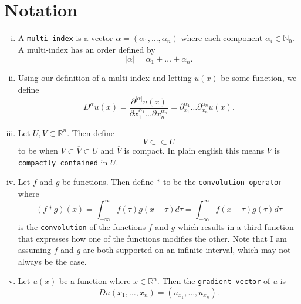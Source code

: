 \documentclass[11pt]{article}
\theoremstyle{definition}
\begin{document}
\section*{Notation}
%
\begin{enumerate}[(i)]
	\item A \texttt{multi-index} is a vector $\alpha = (\alpha_1, \dots, \alpha_n)$ where each component $\alpha_i \in \mathbb{N}_0$.
A multi-index has an order defined by
\[|\alpha| = \alpha_1 + \dots + \alpha_n.\]

\item Using our definition of a multi-index and letting $u(x)$ be some function, we define
\[D^{\alpha}u(x) = \frac{\partial^{|\alpha|}u(x)}{\partial x_1^{\alpha_1} \dots \partial x_n^{\alpha_n}} = \partial_{x_1}^{\alpha_1}\dots\partial_{x_n}^{\alpha_n}u(x).\]

\item Let $U,V \subset \mathbb{R}^n$. Then define
\[V \subset\subset U\]
to be when $V \subset \overline{V} \subset U$ and $\overline{V}$ is compact. In plain english this means $V$ is \texttt{compactly contained} in $U$.

\item Let $f$ and $g$ be functions. Then define $*$ to be the \texttt{convolution operator} where
\[(f*g)(x) = \int_{-\infty}^{\infty}{f(\tau)g(x - \tau)d\tau} = \int_{-\infty}^{\infty}{f(x - \tau)g(\tau)d\tau}\]
is the \texttt{convolution} of the functions $f$ and $g$ which results in a third function that expresses
how one of the functions modifies the other. Note that I am assuming $f$ and $g$ are both supported on an
infinite interval, which may not always be the case.

\item Let $u(x)$ be a function where $x \in \mathbb{R}^n$. Then the \texttt{gradient vector} of $u$ is 
	\[Du(x_1,\dots,x_n) = (u_{x_1},...,u_{x_n}).\]

\end{enumerate}

\newpage



\end{document}
